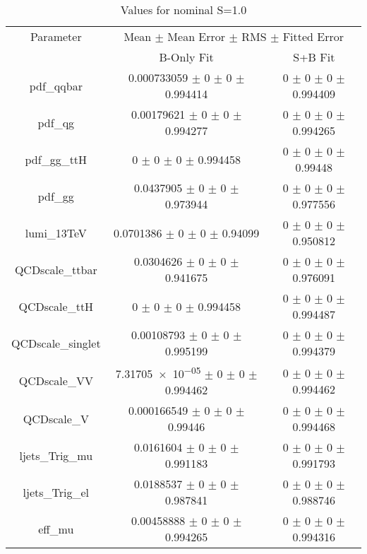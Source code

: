 \begin{table}
\centering
\caption{Values for nominal S=1.0}
\begin{tabular}{ccc}
\toprule
Parameter & \multicolumn{2}{c}{Mean $\pm$ Mean Error $\pm$ RMS $\pm$ Fitted Error}\\
 & B-Only Fit & S+B Fit\\
\midrule
pdf\_qqbar & \num{0.000733059} $\pm$ \num{0} $\pm$ \num{0} $\pm$ \num{0.994414} & \num{0} $\pm$ \num{0} $\pm$ \num{0} $\pm$ \num{0.994409}\\
pdf\_qg & \num{0.00179621} $\pm$ \num{0} $\pm$ \num{0} $\pm$ \num{0.994277} & \num{0} $\pm$ \num{0} $\pm$ \num{0} $\pm$ \num{0.994265}\\
pdf\_gg\_ttH & \num{0} $\pm$ \num{0} $\pm$ \num{0} $\pm$ \num{0.994458} & \num{0} $\pm$ \num{0} $\pm$ \num{0} $\pm$ \num{0.99448}\\
pdf\_gg & \num{0.0437905} $\pm$ \num{0} $\pm$ \num{0} $\pm$ \num{0.973944} & \num{0} $\pm$ \num{0} $\pm$ \num{0} $\pm$ \num{0.977556}\\
lumi\_13TeV & \num{0.0701386} $\pm$ \num{0} $\pm$ \num{0} $\pm$ \num{0.94099} & \num{0} $\pm$ \num{0} $\pm$ \num{0} $\pm$ \num{0.950812}\\
QCDscale\_ttbar & \num{0.0304626} $\pm$ \num{0} $\pm$ \num{0} $\pm$ \num{0.941675} & \num{0} $\pm$ \num{0} $\pm$ \num{0} $\pm$ \num{0.976091}\\
QCDscale\_ttH & \num{0} $\pm$ \num{0} $\pm$ \num{0} $\pm$ \num{0.994458} & \num{0} $\pm$ \num{0} $\pm$ \num{0} $\pm$ \num{0.994487}\\
QCDscale\_singlet & \num{0.00108793} $\pm$ \num{0} $\pm$ \num{0} $\pm$ \num{0.995199} & \num{0} $\pm$ \num{0} $\pm$ \num{0} $\pm$ \num{0.994379}\\
QCDscale\_VV & \num{7.31705e-05} $\pm$ \num{0} $\pm$ \num{0} $\pm$ \num{0.994462} & \num{0} $\pm$ \num{0} $\pm$ \num{0} $\pm$ \num{0.994462}\\
QCDscale\_V & \num{0.000166549} $\pm$ \num{0} $\pm$ \num{0} $\pm$ \num{0.99446} & \num{0} $\pm$ \num{0} $\pm$ \num{0} $\pm$ \num{0.994468}\\
ljets\_Trig\_mu & \num{0.0161604} $\pm$ \num{0} $\pm$ \num{0} $\pm$ \num{0.991183} & \num{0} $\pm$ \num{0} $\pm$ \num{0} $\pm$ \num{0.991793}\\
ljets\_Trig\_el & \num{0.0188537} $\pm$ \num{0} $\pm$ \num{0} $\pm$ \num{0.987841} & \num{0} $\pm$ \num{0} $\pm$ \num{0} $\pm$ \num{0.988746}\\
eff\_mu & \num{0.00458888} $\pm$ \num{0} $\pm$ \num{0} $\pm$ \num{0.994265} & \num{0} $\pm$ \num{0} $\pm$ \num{0} $\pm$ \num{0.994316}\\

\end{tabular}
\end{table}
